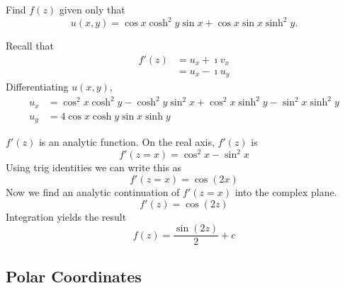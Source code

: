 \begin{Example}
  Find $f(z)$ given only that
  \[
  u(x,y)  = \cos x \cosh^2 y \sin x + \cos x \sin x \sinh^2 y.
  \]


  Recall that
  \begin{align*}
    f'(z) &= u_x + \imath v_x 
    \\
    &= u_x - \imath u_y
  \end{align*}
  Differentiating $u(x, y)$,
  \begin{align*}
    u_x &= \cos^2 x \cosh^2 y - \cosh^2 y \sin^2 x + \cos^2 x \sinh^2 y -
    \sin^2 x \sinh^2 y \\
    u_y &= 4 \cos x \cosh y \sin x \sinh y
  \end{align*}

  $f'(z)$ is an analytic function.  On the real axis, $f'(z)$ is
  \[
  f'(z = x) = \cos^2 x - \sin^2 x
  \]
  Using trig identities we can write this as
  \[
  f'(z = x) = \cos(2 x)
  \]
  Now we find an analytic continuation of $f'(z = x)$ into the complex plane.
  \[
  f'(z) = \cos(2 z)
  \]
  Integration yields the result
  \[
  \boxed{ 
    f(z) = \frac{\sin(2 z)}{2} + c 
    }
  \]
\end{Example}







\subsection{Polar Coordinates}



